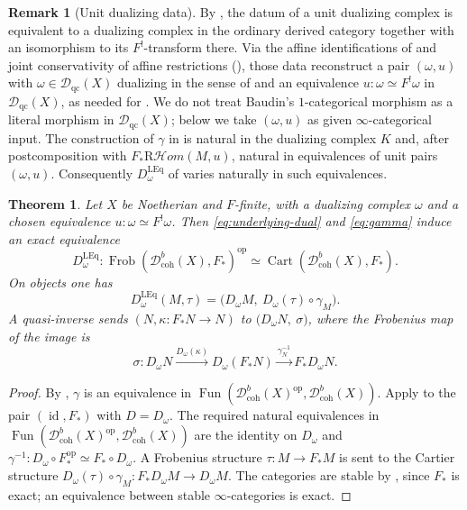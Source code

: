 \documentclass[11pt]{amsart}
\newcommand{\Cart}{\operatorname{Cart}}
\newcommand{\id}{\operatorname{id}}
\newcommand{\op}{{\operatorname{op}}}
\DeclareMathOperator{\Fun}{\mathrm{Fun}}
\newcommand{\RHom}{\mathrm R\mathcal Hom}
\newcommand{\Frob}{\operatorname{Frob}}
\newcommand{\Dqc}{\mathcal D_{\mathrm{qc}}}
\newcommand{\Dbc}{\mathcal D^b_{\mathrm{coh}}}
\theoremstyle{plain}
\newtheorem{theorem}[theorem]{Theorem}
\theoremstyle{definition}
\newtheorem{remark}[remark]{Remark}
\numberwithin{equation}{section}
\begin{document}
\begin{remark}[Unit dualizing data]\label{rem:unit-choice}
By \cite[Remark 4.2.2]{Bau}, the datum of a unit dualizing complex is equivalent to a dualizing complex in the ordinary derived category together with an isomorphism to its $F^!$-transform there.
Via the affine identifications of  and joint conservativity of affine restrictions (), those data reconstruct a pair $(\omega,u)$ with $\omega\in\Dqc(X)$ dualizing in the sense of  and an equivalence $u:\omega\simeq F^!\omega$ in $\Dqc(X)$, as needed for .
We do not treat Baudin's $1$-categorical morphism as a literal morphism in $\Dqc(X)$; below we take $(\omega,u)$ as given $\infty$-categorical input.
The construction of $\gamma$ in  is natural in the dualizing complex $K$ and, after postcomposition with $F_*\RHom(M,u)$, natural in equivalences of unit pairs $(\omega,u)$.
Consequently $D_\omega^{\mathrm{LEq}}$ of  varies naturally in such equivalences.
\end{remark}

\begin{theorem}\label{thm:intrinsic}
Let $X$ be Noetherian and $F$-finite, with a dualizing complex $\omega$ and a chosen equivalence $u:\omega\simeq F^!\omega$.
Then \eqref{eq:underlying-dual} and \eqref{eq:gamma} induce an exact equivalence
\[
 D^{\mathrm{LEq}}_\omega:
 \Frob(\Dbc(X),F_*)^{\op}\simeq\Cart(\Dbc(X),F_*).
\]
On objects one has
\[
 D_\omega^{\mathrm{LEq}}(M,\tau)=\bigl(D_\omega M,\ D_\omega(\tau)\circ\gamma_M\bigr).
\]
A quasi-inverse sends $(N,\kappa:F_*N\to N)$ to $\bigl(D_\omega N,\ \sigma\bigr)$, where the Frobenius map of the image is
\[
 \sigma:
 D_\omega N
 \xrightarrow{D_\omega(\kappa)}
 D_\omega(F_*N)
 \xrightarrow{\gamma_N^{-1}}
 F_*D_\omega N.
\]
\end{theorem}
\begin{proof}
By , $\gamma$ is an equivalence in $\Fun(\Dbc(X)^{\op},\Dbc(X))$.
Apply  to the pair $(\id,F_*)$ with $D=D_\omega$.
The required natural equivalences in $\Fun(\Dbc(X)^{\op},\Dbc(X))$ are the identity on $D_\omega$ and $\gamma^{-1}:D_\omega\circ F_*^{\op}\simeq F_*\circ D_\omega$.
A Frobenius structure $\tau:M\to F_*M$ is sent to the Cartier structure $D_\omega(\tau)\circ\gamma_M:F_*D_\omega M\to D_\omega M$.
The categories are stable by \cite[Proposition 2.6(e)]{MWC}, since $F_*$ is exact; an equivalence between stable $\infty$-categories is exact.
\end{proof}
\end{document}
